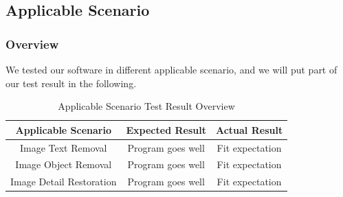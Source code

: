 \documentclass[12pt]{article}
\begin{document}
\subsection{Applicable Scenario}
\subsubsection*{Overview}
\qquad We tested our software in different applicable scenario, and we will put part of our test result in the following.
\begin{table}[H]
	\centering
	\begin{tabular}{|c|c|c|}
		\hline
		Applicable Scenario & Expected Result& Actual Result\\
		\hline
		Image Text Removal & Program goes well& Fit expectation\\
		\hline
		Image Object Removal & Program goes well& Fit expectation\\
		\hline
		Image Detail Restoration  & Program goes well& Fit expectation\\
		\hline
	\end{tabular}
	\caption{Applicable Scenario Test Result Overview}
\end{table}
\end{document}

